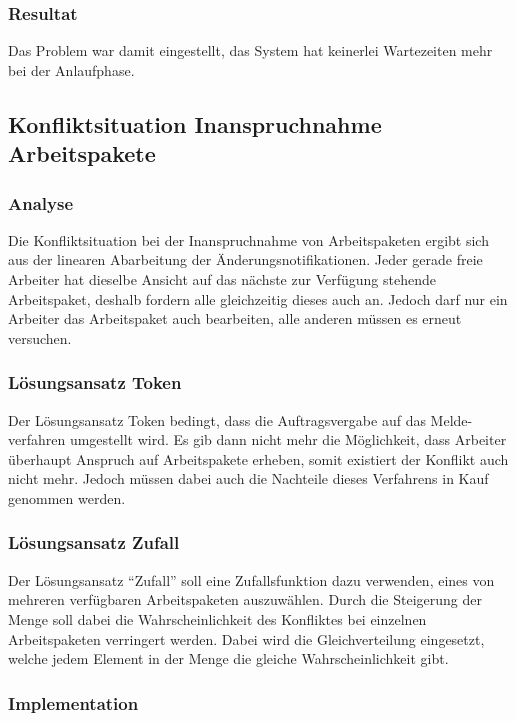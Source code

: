 \subsubsection{Resultat}
Das Problem war damit eingestellt, das System hat keinerlei Wartezeiten mehr bei der Anlaufphase.


\subsection{Konfliktsituation Inanspruchnahme Arbeitspakete}
\subsubsection{Analyse}
Die Konfliktsituation bei der Inanspruchnahme von Arbeitspaketen ergibt sich aus der linearen Abarbeitung der Änderungsnotifikationen.
Jeder gerade freie Arbeiter hat dieselbe Ansicht auf das nächste zur Verfügung stehende Arbeitspaket, deshalb fordern alle gleichzeitig dieses auch an.
Jedoch darf nur ein Arbeiter das Arbeitspaket auch bearbeiten,
alle anderen müssen es erneut versuchen.

\subsubsection{Lösungsansatz Token}
Der Lösungsansatz Token bedingt, dass die Auftragsvergabe auf das Melde-verfahren umgestellt wird.
Es gib dann nicht mehr die Möglichkeit, dass Arbeiter überhaupt Anspruch auf Arbeitspakete erheben, somit existiert der Konflikt auch nicht mehr.
Jedoch müssen dabei auch die Nachteile dieses Verfahrens in Kauf genommen werden.

\subsubsection{Lösungsansatz Zufall}

Der Lösungsansatz ``Zufall'' soll eine Zufallsfunktion dazu verwenden,
eines von mehreren verfügbaren Arbeitspaketen auszuwählen.
Durch die Steigerung der Menge soll dabei die Wahrscheinlichkeit des Konfliktes bei einzelnen Arbeitspaketen verringert werden. Dabei wird die Gleichverteilung eingesetzt, welche jedem Element in der Menge die gleiche Wahrscheinlichkeit gibt.

\subsubsection{Implementation}


